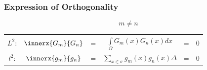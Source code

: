 \documentclass[handout]{beamer}
\begin{document}
\begin{frame}      %
  \frametitle{Expression of Orthogonality}
    $$m\ne n$$
\begin{table}[htdp]
    \begin{center}
        \begin{tabular}{cccccc}
          $L^{2}$: & $\innerx{G_{m}}{G_{n}}$ & = & $\int\limits_{\Omega} G_{m}(x) G_{n}(x) dx$ & = & 0\\[30pt]
          $l^{2}$: & $\innerx{g_{m}}{g_{n}}$ & = & $\sum\limits_{x\in\sigma} g_{m}(x) g_{n}(x) \Delta$ & = & 0
        \end{tabular}
    \end{center}
\end{table}%
\end{frame}
\end{document}
